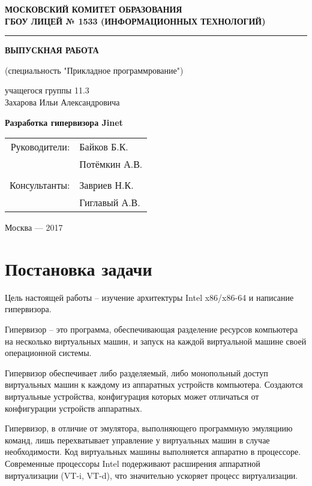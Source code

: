 \documentclass[a4paper,12pt]{extarticle}
\begin{document}
	\begin{titlepage}
		\centering
		\textbf{\uppercase{Московский комитет образования\\ГБОУ Лицей № 1533 (информационных технологий)}}\par
		\rule{\textwidth}{1pt}\par
		\vspace{3cm}
		\large\textbf{ВЫПУСКНАЯ РАБОТА}\par
		\vspace{0.5cm}
		\large(специальность "Прикладное программрование")\par
		\vspace{0.5cm}
		\large{учащегося группы 11.3\\Захарова Ильи Александровича}\par
		\vspace{2cm}
		{\Huge{\textbf{Разработка гипервизора Jinet}}}\par
		\vspace{3cm}
		\begin{flushright}
			\begin{tabular}{rl}
				Руководители:& Байков Б.К.\\
							 & Потёмкин А.В.\\
							 \\
				Консультанты:& Завриев Н.К.\\
							 & Гиглавый А.В.
				
			\end{tabular}
		\end{flushright}
		\par
		\vfill
		Москва --- 2017
	\end{titlepage}
	\tableofcontents
	\pagebreak
	\section{Постановка задачи}
	
	Цель настоящей работы – изучение архитектуры Intel x86/x86-64 и написание гипервизора.\par
	Гипервизор – это программа, обеспечивающая разделение ресурсов компьютера на несколько виртуальных машин, и запуск на каждой виртуальной машине своей операционной системы.\par
	Гипервизор обеспечивает либо разделяемый, либо монопольный доступ виртуальных машин к каждому из аппаратных устройств компьютера. Создаются виртуальные устройства, конфигурация которых может отличаться от конфигурации устройств аппаратных.\par
	Гипервизор, в отличие от эмулятора, выполняющего программную эмуляциию команд, лишь перехватывает управление у виртуальных машин в случае необходимости. Код виртуальных машины выполняется аппаратно в процессоре. Современные процессоры Intel подерживают расширения аппаратной виртуализации (VT-i, VT-d), что значительно ускоряет процесс виртуализации.
	
\end{document}
